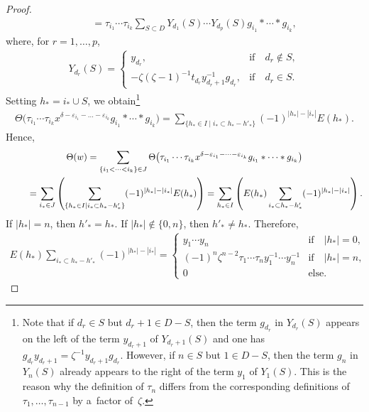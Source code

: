 \documentclass[11pt]{article}
\numberwithin{equation}{section}
\begin{document}
\begin{proof}
\begin{gather*}
\qquad
= \tau_{i_1}\cdots \tau_{i_k} \sum\limits_{S\subset D} Y_{d_1}(S) \cdots Y_{d_p}(S) g_{i_1}*\cdots * g_{i_k},
\end{gather*}
where, for $r=1,\ldots, p$,
\begin{gather*}
Y_{d_r}(S) =
\begin{cases}
y_{d_r}, & \text{if} \quad d_r\notin S,
\\
- \zeta(\zeta-1)^{-1} t_{d_r}y_{d_r+1}^{-1}g_{d_r}, & \text{if} \quad d_r\in S.
\end{cases}
\end{gather*}
Setting $h_* = i_* \cup S$, we obtain\footnote{Note that if $d_r\in S$ but $d_r+1\in D-S$, then the term $g_{d_r}$ in
$Y_{d_r}(S)$ appears on the left of the term $y_{d_r+1}$ of $Y_{d_r+1}(S)$ and one has $g_{d_r} y_{d_r+1} = \zeta^{-1}
y_{d_r+1} g_{d_r}$.
However, if $n\in S$ but $1\in D-S$, then the term $g_n$ in $Y_n(S)$ already appears to the right of the term $y_1$ of
$Y_1(S)$.
This is the reason why the def\/inition of $\tau_n$ dif\/fers from the corresponding def\/initions of $\tau_1,\ldots,
\tau_{n-1}$ by a~factor of~$\zeta$.}
\begin{gather*}
\Theta\big(\tau_{i_1}\cdots \tau_{i_k} x^{\delta-\varepsilon_{i_1} - \dots - \varepsilon_{i_k}} g_{i_1}*\cdots * g_{i_k}\big) =
\sum\limits_{\{h_*\in I \mid i_*\subset h_*- h'_* \}} (-1)^{|h_*|-|i_*|} E(h_*).
\end{gather*}
Hence,
\begin{gather*}
\Theta(w) = \sum\limits_{\{i_1<\dots<i_k\}\in J} \Theta\big(\tau_{i_1}\cdots \tau_{i_k} x^{\delta-\varepsilon_{i_1} - \dots -
\varepsilon_{i_k}} g_{i_1}*\dots * g_{i_k}\big)
\\
\hphantom{\Theta(w)}{}
{} = \sum\limits_{i_*\in J} \left(\sum\limits_{\{h_*\in I \mid i_*\subset h_*- h'_*\}} (-1)^{|h_*|-|i_*|} E(h_*) \right)
 = \sum\limits_{h_*\in I} \left (E(h_*) \sum\limits_{i_*\subset h_*-h'_*} (-1)^{|h_*|-|i_*|} \right).
\end{gather*}
If $|h_*|=n$, then $h'_*= h_*$.
If $|h_*|\notin\{0,n\}$, then $h'_* \neq h_*$.
Therefore,
\begin{gather*}
E(h_*) \sum\limits_{i_*\subset h_*-h'_*} (-1)^{|h_*|-|i_*|} =
\begin{cases}
y_1\cdots y_n & \text{if} \quad |h_*|=0,
\\
(-1)^n \zeta^{n-2} \tau_1\cdots \tau_n y_1^{-1} \cdots y_n^{-1} & \text{if} \quad |h_*|=n,
\\
0 & \text{else.}
\end{cases}
\tag*{\qed}
\end{gather*}
\renewcommand{\qed}{}
\end{proof}
\end{document}
